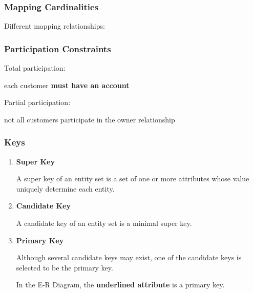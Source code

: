 \documentclass[11pt,a4paper]{article}
\begin{document}
\subsubsection{Mapping Cardinalities}
Different mapping relationships:

\subsubsection{Participation Constraints}
Total participation: \par
each customer \textbf{must have an account}

Partial participation: \par
not all customers participate in the owner relationship

\subsubsection{Keys}
\begin{enumerate}
    \item [1.] \textbf{Super Key} \par
        A super key of an entity set is a set of one or more attributes whose value uniquely determine each entity. \par
    
    \item[2.] \textbf{Candidate Key} \par
        A candidate key of an entity set is a minimal super key. \par
         \par

    \item[3.] \textbf{Primary Key} \par
        Although several candidate keys may exist, one of the candidate keys is selected to be the primary key. \par
        In the E-R Diagram, the \textbf{underlined attribute} is a primary key. \par

\end{enumerate}
\end{document}
